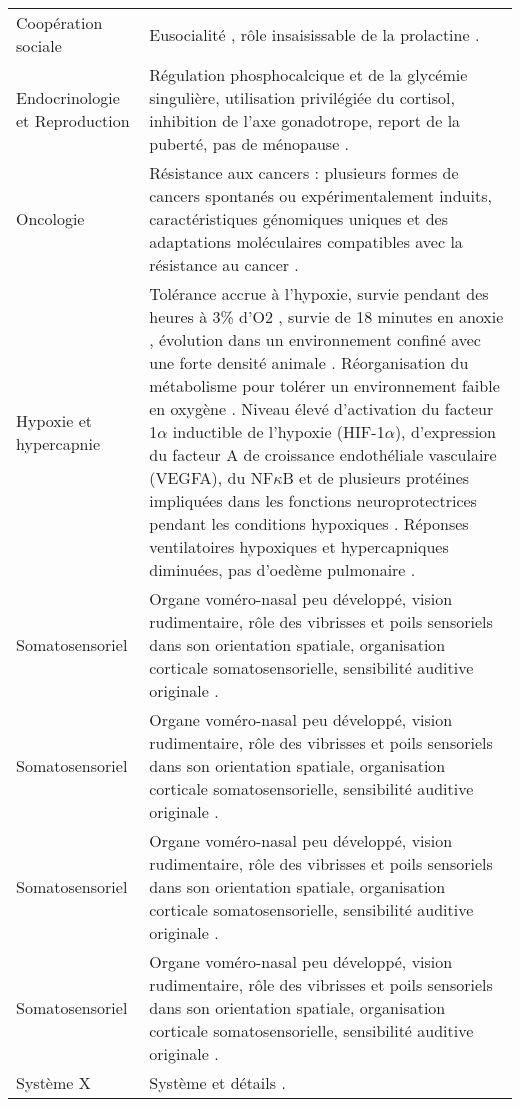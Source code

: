 \begin{center}
\begin{longtable}{p{3cm}p{10.5cm}}
Coopération sociale             &   Eusocialité \cite{Ruppell1842, Faulkes2013}, rôle insaisissable de la prolactine \cite{Faulkes2013}. \\
Endocrinologie et \newline Reproduction   &   Régulation phosphocalcique et de la glycémie singulière, utilisation privilégiée du cortisol, inhibition de l’axe gonadotrope, report de la puberté, pas de ménopause \cite{Faulkes2013}.   \\
Oncologie                       & Résistance aux cancers : plusieurs formes de cancers spontanés ou expérimentalement induits, caractéristiques génomiques uniques et des adaptations moléculaires compatibles avec la résistance au cancer \cite{Faulkes2013}.      \\
Hypoxie et \newline hypercapnie          &   Tolérance accrue à l'hypoxie, survie pendant des heures à 3\% d'O2 \cite{Faulkes2013}, survie de 18 minutes en anoxie \cite{Faulkes2013}, évolution dans un environnement confiné avec une forte densité animale \cite{Faulkes2013}. Réorganisation du métabolisme pour tolérer un environnement faible en oxygène \cite{Faulkes2013}. Niveau élevé d'activation du facteur 1$\alpha$ inductible de l'hypoxie (HIF-1$\alpha$), d'expression du facteur A de croissance endothéliale vasculaire (VEGFA), du NF$\kappa$B et de plusieurs protéines impliquées dans les fonctions neuroprotectrices pendant les conditions hypoxiques \cite{Faulkes2013}. Réponses ventilatoires hypoxiques et hypercapniques diminuées, pas d'oedème pulmonaire \cite{Faulkes2013}. \\
Somatosensoriel                 & Organe voméro-nasal peu développé, vision rudimentaire, rôle des vibrisses et poils sensoriels dans son orientation spatiale, organisation corticale somatosensorielle, sensibilité auditive originale \cite{Faulkes2013}.     \\ 
Somatosensoriel                 & Organe voméro-nasal peu développé, vision rudimentaire, rôle des vibrisses et poils sensoriels dans son orientation spatiale, organisation corticale somatosensorielle, sensibilité auditive originale \cite{Faulkes2013}.     \\ 
Somatosensoriel                 & Organe voméro-nasal peu développé, vision rudimentaire, rôle des vibrisses et poils sensoriels dans son orientation spatiale, organisation corticale somatosensorielle, sensibilité auditive originale \cite{Faulkes2013}.     \\ 
Somatosensoriel                 & Organe voméro-nasal peu développé, vision rudimentaire, rôle des vibrisses et poils sensoriels dans son orientation spatiale, organisation corticale somatosensorielle, sensibilité auditive originale \cite{Faulkes2013}.     \\ 
Système X & Système et détails \cite{Faulkes2013}.   \\
\end{longtable}
\end{center}



